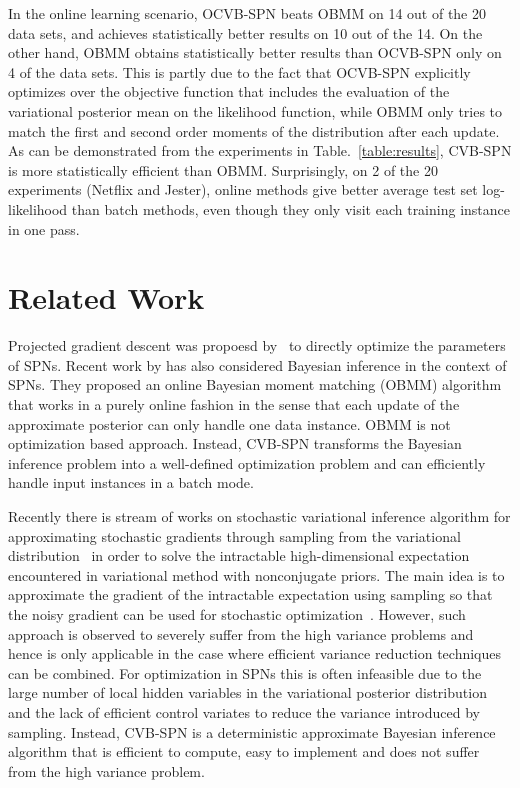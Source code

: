 \documentclass{article} %
\theoremstyle{definition}
\begin{document}
In the online learning scenario, OCVB-SPN beats OBMM on 14 out of the 20 data sets, and achieves statistically better results on 10 out of the 14. On the other hand, OBMM obtains statistically better results than OCVB-SPN only on 4 of the data sets. This is partly due to the fact that OCVB-SPN explicitly optimizes over the objective function that includes the evaluation of the variational posterior mean on the likelihood function, while OBMM only tries to match the first and second order moments of the distribution after each update. As can be demonstrated from the experiments in Table.~\ref{table:results}, CVB-SPN is more statistically efficient than OBMM. Surprisingly, on 2 of the 20 experiments (Netflix and Jester), online methods give better average test set log-likelihood than batch methods, even though they only visit each training instance in one pass. 

\section{Related Work}
Projected gradient descent was propoesd by~\cite{peharz2015foundations} to directly optimize the parameters of SPNs. Recent work by \citet{rashwan2016bmm} has also considered Bayesian inference in the context of SPNs. They proposed an online Bayesian moment matching (OBMM) algorithm that works in a purely online fashion in the sense that each update of the approximate posterior can only handle one data instance. OBMM is not optimization based approach. Instead, CVB-SPN transforms the Bayesian inference problem into a well-defined optimization problem and can efficiently handle input instances in a batch mode.

Recently there is stream of works on stochastic variational inference algorithm for approximating stochastic gradients through sampling from the variational distribution~\cite{kingma2013auto,mnih2014neural,blei2012variational,titsias2014doubly,titsias2015local} in order to solve the intractable high-dimensional expectation encountered in variational method with nonconjugate priors. The main idea is to approximate the gradient of the intractable expectation using sampling so that the noisy gradient can be used for stochastic optimization~\cite{mnih2014neural,blei2012variational}. However, such approach is observed to severely suffer from the high variance problems and hence is only applicable in the case where efficient variance reduction techniques can be combined. For optimization in SPNs this is often infeasible due to the large number of local hidden variables in the variational posterior distribution and the lack of efficient control variates to reduce the variance introduced by sampling. Instead, CVB-SPN is a deterministic approximate Bayesian inference algorithm that is efficient to compute, easy to implement and does not suffer from the high variance problem. 
\end{document}

